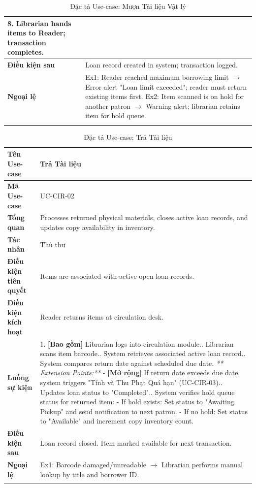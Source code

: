 \begin{longtable}{|p{3.5cm}|p{11.5cm}|}
    8. Librarian hands items to Reader; transaction completes. \\
    \hline
    \textbf{Điều kiện sau} & Loan record created in system; transaction logged. \\
    \hline
    \textbf{Ngoại lệ} & 
    Ex1: Reader reached maximum borrowing limit $\rightarrow$ Error alert "Loan limit exceeded"; reader must return existing items first.\newline
    Ex2: Item scanned is on hold for another patron $\rightarrow$ Warning alert; librarian retains item for hold queue. \\
    \hline
    \caption{Đặc tả Use-case: Mượn Tài liệu Vật lý}
\end{longtable}

\newpage
\begin{longtable}{|p{3.5cm}|p{11.5cm}|}
    \hline
    \textbf{Tên Use-case} & \textbf{Trả Tài liệu} \\
    \hline
    \textbf{Mã Use-case} & UC-CIR-02 \\
    \hline
    \textbf{Tổng quan} & Processes returned physical materials, closes active loan records, and updates copy availability in inventory. \\
    \hline
    \textbf{Tác nhân} & Thủ thư \\
    \hline
    \textbf{Điều kiện tiên quyết} & Items are associated with active open loan records. \\
    \hline
    \textbf{Điều kiện kích hoạt} & Reader returns items at circulation desk. \\
    \hline
    \textbf{Luồng sự kiện} & 
    1. \textbf{[Bao gồm]} Librarian logs into circulation module.\newline
    2. Librarian scans item barcode.\newline
    3. System retrieves associated active loan record.\newline
    4. System compares return date against scheduled due date.\newline
    \textit{** Extension Points:**}\newline
    - \textbf{[Mở rộng]} If return date exceeds due date, system triggers "Tính và Thu Phạt Quá hạn" (UC-CIR-03).\newline
    5. Updates loan status to "Completed".\newline
    6. System verifies hold queue status for returned item:\newline
    - If hold exists: Set status to "Awaiting Pickup" and send notification to next patron.\newline
    - If no hold: Set status to "Available" and increment copy inventory count. \\
    \hline
    \textbf{Điều kiện sau} & Loan record closed. Item marked available for next transaction. \\
    \hline
    \textbf{Ngoại lệ} & 
    Ex1: Barcode damaged/unreadable $\rightarrow$ Librarian performs manual lookup by title and borrower ID. \\
    \hline
    \caption{Đặc tả Use-case: Trả Tài liệu}
\end{longtable}

